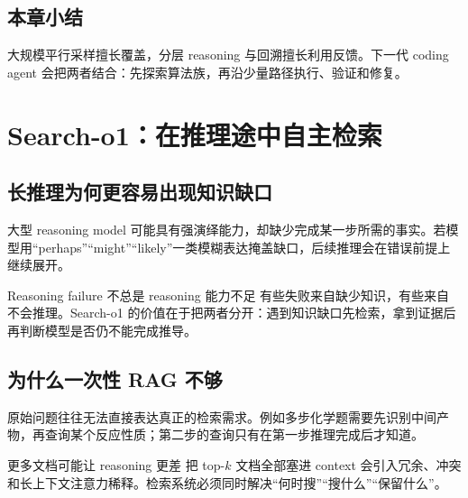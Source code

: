 \documentclass[a4paper]{article}
\begin{document}
\subsection{本章小结}

大规模平行采样擅长覆盖，分层 reasoning 与回溯擅长利用反馈。下一代 coding agent 会把两者结合：先探索算法族，再沿少量路径执行、验证和修复。

\section{Search-o1：在推理途中自主检索}

\subsection{长推理为何更容易出现知识缺口}



大型 reasoning model 可能具有强演绎能力，却缺少完成某一步所需的事实。若模型用“perhaps”“might”“likely”一类模糊表达掩盖缺口，后续推理会在错误前提上继续展开。

\begin{importantbox}{Reasoning failure 不总是 reasoning 能力不足}
有些失败来自缺少知识，有些来自不会推理。Search-o1 的价值在于把两者分开：遇到知识缺口先检索，拿到证据后再判断模型是否仍不能完成推导。
\end{importantbox}

\subsection{为什么一次性 RAG 不够}


原始问题往往无法直接表达真正的检索需求。例如多步化学题需要先识别中间产物，再查询某个反应性质；第二步的查询只有在第一步推理完成后才知道。

\begin{warningbox}{更多文档可能让 reasoning 更差}
把 top-$k$ 文档全部塞进 context 会引入冗余、冲突和长上下文注意力稀释。检索系统必须同时解决“何时搜”“搜什么”“保留什么”。
\end{warningbox}
\end{document}
